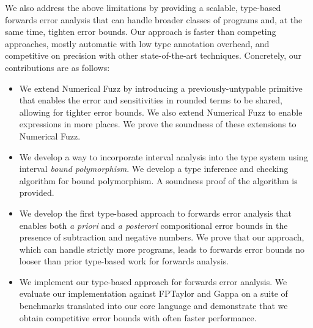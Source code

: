 We also address the above limitations by providing a scalable, type-based
forwards error analysis that can handle broader classes of programs and, at the
same time, tighten error bounds. Our approach is faster than competing
approaches, mostly automatic with low type annotation overhead, and competitive
on precision with other state-of-the-art techniques. Concretely, our
contributions are as follows:
\begin{itemize}
  \item We extend Numerical Fuzz by introducing a previously-untypable primitive
    that enables the error and sensitivities in rounded terms to be shared,
    allowing for tighter error bounds. We also extend Numerical Fuzz to enable
    expressions in more places. We prove the soundness of these extensions to
    Numerical Fuzz.

  \item We develop a way to incorporate interval analysis into the type system
    using interval \textit{bound polymorphism}. We develop a type
    inference and checking algorithm for bound polymorphism. A soundness proof
    of the algorithm is provided.

  \item We develop the first type-based approach to forwards error analysis that
    enables both \textit{a priori} and \textit{a posterori} compositional error
    bounds in the presence of subtraction and negative numbers. We prove that
    our approach, which can handle strictly more programs, leads to forwards
    error bounds no looser than prior type-based work for forwards analysis.

  \item We implement our type-based approach for forwards error analysis. We
    evaluate our implementation against FPTaylor and Gappa on a suite of
    benchmarks translated into our core language and demonstrate that we obtain
    competitive error bounds with often faster performance.
\end{itemize}
